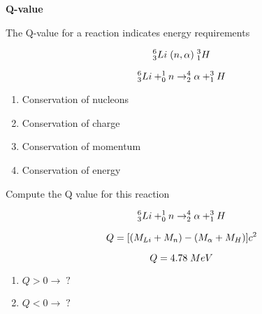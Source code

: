 \documentclass[aspectratio=1610,pdftex,dvipsnames,compress,xcolor={dvipsnames}]{beamer}
\begin{document}
\begin{frame}[plain]{}
    \centering\LARGE\textbf{Q-value}
\end{frame}


\addtocounter{framenumber}{-1}
\begin{frame}{The Q-value for a reaction indicates energy requirements}

    \begin{equation}
        \LARGE
        ^6_3Li \; (n,\alpha) \; ^3_1H
    \end{equation}

    \begin{equation}
        \LARGE
        ^6_3Li + ^1_0n \rightarrow ^4_2\alpha + ^3_1H
    \end{equation}

    \vspace*{\fill}

    \begin{enumerate}[series=outerlist,topsep=0pt,itemsep=15pt,leftmargin=*,label=(\arabic*)]
        \item Conservation of nucleons
        \item Conservation of charge
        \item Conservation of momentum
        \item Conservation of energy
    \end{enumerate}
\end{frame}


\begin{frame}{Compute the Q value for this reaction}

    \begin{equation}
        \LARGE
        ^6_3Li + ^1_0n \rightarrow ^4_2\alpha + ^3_1H
    \end{equation}

    \begin{equation}
        \LARGE
        Q = [(M_{Li} + M_n) - (M_{\alpha} + M_H)]c^2
    \end{equation}

    \begin{equation}
        \LARGE
        Q = 4.78 \; MeV
    \end{equation}

    \vspace*{\fill}

    \begin{enumerate}[series=outerlist,topsep=0pt,itemsep=21pt,leftmargin=*,label=(\arabic*)]
        \item[]\LARGE $Q > 0 \rightarrow \; ?$
        \item[]\LARGE $Q < 0 \rightarrow \; ?$
    \end{enumerate}
\end{frame}
\end{document}
